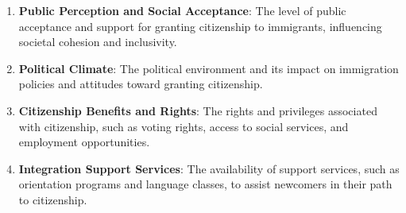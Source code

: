 \begin{enumerate}
  \item \textbf{Public Perception and Social Acceptance}: The level
  of public acceptance and support for granting citizenship to
  immigrants, influencing societal cohesion and inclusivity.
  
  \item \textbf{Political Climate}: The political environment and
  its impact on immigration policies and attitudes toward granting
  citizenship.
  
  \item \textbf{Citizenship Benefits and Rights}: The rights and
  privileges associated with citizenship, such as voting rights,
  access to social services, and employment opportunities.
  
  \item \textbf{Integration Support Services}: The availability of
  support services, such as orientation programs and language
  classes, to assist newcomers in their path to citizenship.
\end{enumerate}
